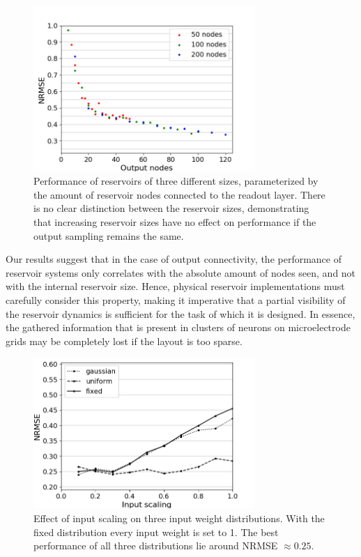 \begin{figure}[H]
  \centering
  \includegraphics[width=3.3in]{img/output_nodes.png}
  \caption{
    Performance of reservoirs of three different sizes, parameterized by the
amount of reservoir nodes connected to the readout layer. There is no clear
distinction between the reservoir sizes, demonstrating that increasing reservoir
sizes have no effect on performance if the output sampling remains the same.
  }
  \label{output_nodes}
\end{figure}

Our results suggest that in the case of output connectivity, the performance of
reservoir systems only correlates with the absolute amount of nodes seen, and
not with the internal reservoir size. Hence, physical reservoir implementations
must carefully consider this property, making it imperative that a partial
visibility of the reservoir dynamics is sufficient for the task of which it is
designed. In essence, the gathered information that is present in clusters of
neurons on microelectrode grids may be completely lost if the layout is too
sparse.


\begin{figure}[H]
  \centering
  \includegraphics[width=3.3in]{img/input_scaling_distrib.png}
  \caption{
    Effect of input scaling on three input weight distributions. With the fixed
distribution every input weight is set to 1. The best performance of all three
distributions lie around NRMSE $\approx 0.25$.
  }
  \label{input_scaling_distrib}
\end{figure}

